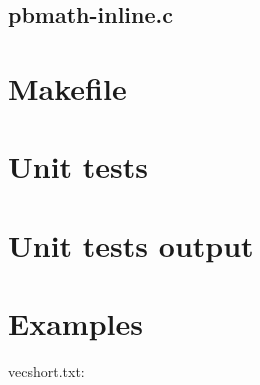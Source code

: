\subsection{pbmath-inline.c}

\begin{scriptsize}
\begin{ttfamily}

\end{ttfamily}
\end{scriptsize}

\section{Makefile}

\begin{scriptsize}
\begin{ttfamily}

\end{ttfamily}
\end{scriptsize}

\section{Unit tests}

\begin{scriptsize}
\begin{ttfamily}

\end{ttfamily}
\end{scriptsize}

\section{Unit tests output}

\begin{scriptsize}
\begin{ttfamily}

\end{ttfamily}
\end{scriptsize}

\section{Examples}

vecshort.txt:\\
\begin{scriptsize}
\begin{ttfamily}

\end{ttfamily}
\end{scriptsize}

